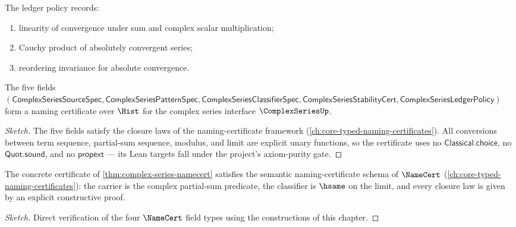 \begin{definition}
\label{def:complex-series-ledger-policy}
The ledger policy records:
\begin{enumerate}
  \item linearity of convergence under sum and complex scalar multiplication;
  \item Cauchy product of absolutely convergent series;
  \item reordering invariance for absolute convergence.
\end{enumerate}
\end{definition}

\begin{theorem}
\label{thm:complex-series-namecert}
The five fields \((\mathsf{ComplexSeriesSourceSpec}, \mathsf{ComplexSeriesPatternSpec}, \mathsf{ComplexSeriesClassifierSpec}, \mathsf{ComplexSeriesStabilityCert}, \mathsf{ComplexSeriesLedgerPolicy})\) form a naming certificate over \(\Hist\) for the complex series interface \(\ComplexSeriesUp\).
\end{theorem}
\begin{proof}[Sketch]
The five fields satisfy the closure laws of the naming-certificate framework (\autoref{ch:core-typed-naming-certificates}). All conversions between term sequence, partial-sum sequence, modulus, and limit are explicit unary functions, so the certificate uses no \(\mathsf{Classical.choice}\), no \(\mathsf{Quot.sound}\), and no \(\mathsf{propext}\) --- its Lean targets fall under the project's axiom-purity gate.
\end{proof}

\begin{theorem}
\label{thm:complex-series-semantic-namecert}
The concrete certificate of \autoref{thm:complex-series-namecert} satisfies the semantic naming-certificate schema of \(\NameCert\) (\autoref{ch:core-typed-naming-certificates}): the carrier is the complex partial-sum predicate, the classifier is \(\hsame\) on the limit, and every closure law is given by an explicit constructive proof.
\end{theorem}
\begin{proof}[Sketch]
Direct verification of the four \(\NameCert\) field types using the constructions of this chapter.
\end{proof}

